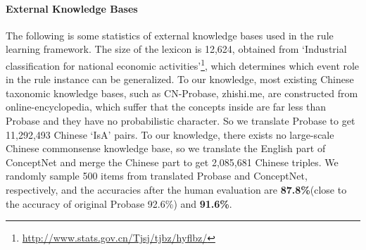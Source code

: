 \paragraph{External Knowledge Bases}
The following is some statistics of external knowledge bases used in the rule learning framework. The size of the lexicon is 12,624, obtained from `Industrial classification for national economic activities'\footnote{\url{ http://www.stats.gov.cn/Tjsj/tjbz/hyflbz/}}, which determines which event role in the rule instance can be generalized. 
To our knowledge, most existing Chinese taxonomic knowledge bases, such as CN-Probase\cite{Xu2017}, zhishi.me\cite{Niu2011}, are constructed from online-encyclopedia, which suffer that the concepts inside are far less than Probase and they have no probabilistic character. So we translate Probase to get 11,292,493 Chinese `IsA' pairs.
To our knowledge, there exists no large-scale Chinese commonsense knowledge base, so we translate the English part of ConceptNet and merge the Chinese part to get 2,085,681 Chinese triples.
We randomly sample 500 items from translated Probase and ConceptNet, respectively, and the accuracies after the human evaluation are \textbf{87.8\%}(close to the accuracy of original Probase 92.6\%) and \textbf{91.6\%}.



